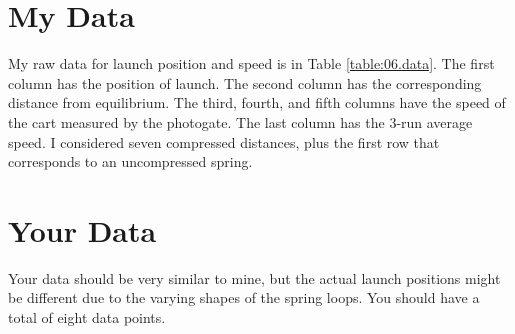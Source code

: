 \section{My Data}
%
My raw data for launch position and speed is in Table \ref{table:06.data}. The first column has the position of launch. The second column has the corresponding distance from equilibrium. The third, fourth, and fifth columns have the speed of the cart measured by the photogate. The last column has the 3-run average speed. I considered seven compressed distances, plus the first row that corresponds to an uncompressed spring.
%
\section{Your Data}
%
Your data should be very similar to mine, but the actual launch positions might be different due to the varying shapes of the spring loops. You should have a total of eight data points.
%
%
